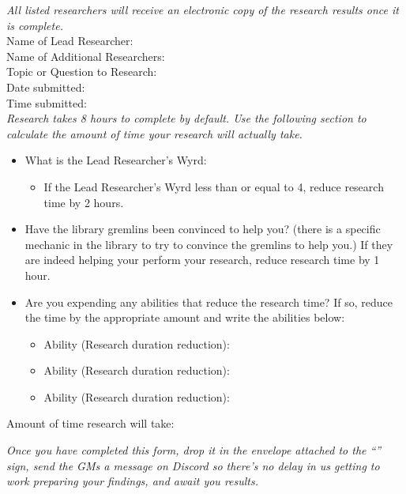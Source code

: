 \documentclass[green]{gl2018}
\begin{document}
\name{\gResearchForm{}}

\emph{All listed researchers will receive an electronic copy of the research results once it is complete.}\\
Name of Lead Researcher:\\
Name of Additional Researchers:\\

Topic or Question to Research:\\
Date submitted:\\
Time submitted:\\

\emph{Research takes 8 hours to complete by default. Use the following section to calculate the amount of time your research will actually take.}
\begin{itemize}
\item What is the Lead Researcher's Wyrd:  
\begin{itemize} \item If the Lead Researcher's Wyrd less than or equal to 4, reduce research time by 2 hours. \end{itemize}
\item Have the library gremlins been convinced to help you? (there is a specific mechanic in the library to try to convince the gremlins to help you.) If they are indeed helping your perform your research, reduce research time by 1 hour.
\item Are you expending any abilities that reduce the research time? If so, reduce the time by the appropriate amount and write the abilities below:
\begin{itemize}
\item Ability (Research duration reduction):
\item Ability (Research duration reduction):
\item Ability (Research duration reduction):
\end{itemize}
\end{itemize}

Amount of time research will take:

\emph{Once you have completed this form, drop it in the envelope attached to the ``\sResearchFormSubmission{\MYname{}}'' sign, send the GMs a message on Discord so there's no delay in us getting to work preparing your findings, and await you results.}
\end{document}
